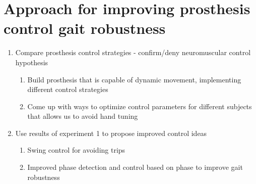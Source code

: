 \section{Approach for improving prosthesis control gait
robustness}\label{sec:intro_approach} 

\begin{enumerate}
\item Compare prosthesis control strategies - confirm/deny neuromuscular control
    hypothesis
    \begin{enumerate}   
        \item Build prosthesis that is capable of dynamic movement, implementing
        different control strategies
        \item Come up with ways to optimize control parameters for different
        subjects that allows us to avoid hand tuning
    \end{enumerate}   

\item Use results of experiment 1 to propose improved control ideas
    \begin{enumerate}   
        \item Swing control for avoiding trips
        \item Improved phase detection and control based on phase to improve
        gait robustness
    \end{enumerate}   
\end{enumerate}
